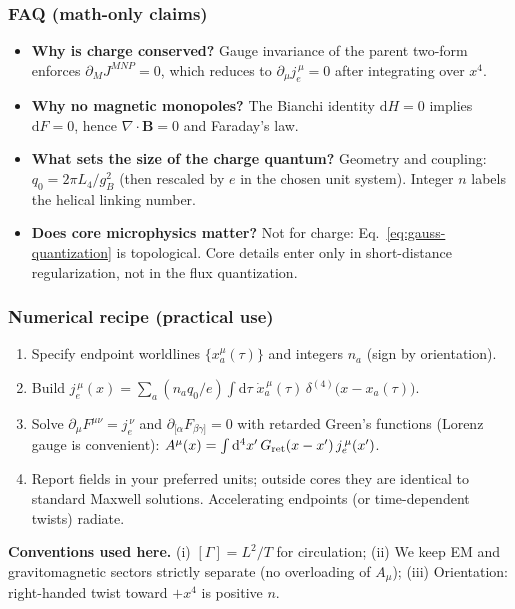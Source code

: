 \subsubsection{FAQ (math-only claims)}
\begin{itemize}
  \item \textbf{Why is charge conserved?} Gauge invariance of the parent two-form enforces $\partial_M J^{MNP}=0$, which reduces to $\partial_\mu j_e^{\,\mu}=0$ after integrating over $x^4$.
  \item \textbf{Why no magnetic monopoles?} The Bianchi identity $\mathrm dH=0$ implies $\mathrm dF=0$, hence $\nabla\!\cdot\!\mathbf B=0$ and Faraday's law.
  \item \textbf{What sets the size of the charge quantum?} Geometry and coupling: $q_0=2\pi L_4/g_B^{2}$ (then rescaled by $e$ in the chosen unit system). Integer $n$ labels the helical linking number.
  \item \textbf{Does core microphysics matter?} Not for charge: Eq.~\eqref{eq:gauss-quantization} is topological. Core details enter only in short-distance regularization, not in the flux quantization.
\end{itemize}

\subsubsection{Numerical recipe (practical use)}
\begin{enumerate}
  \item Specify endpoint worldlines $\{x_a^\mu(\tau)\}$ and integers $n_a$ (sign by orientation).
  \item Build $j_e^{\,\mu}(x)=\sum_a (n_a q_0/e)\int \!\mathrm d\tau\; \dot x_a^{\,\mu}(\tau)\,\delta^{(4)}\big(x-x_a(\tau)\big)$.
  \item Solve $\partial_\mu F^{\mu\nu}= j_e^{\,\nu}$ and $\partial_{[\alpha}F_{\beta\gamma]}=0$ with retarded Green's functions (Lorenz gauge is convenient): $A^\mu(x)=\int \mathrm d^4x'\, G_{\rm ret}(x-x')\, j_e^{\,\mu}(x')$.
  \item Report fields in your preferred units; outside cores they are identical to standard Maxwell solutions. Accelerating endpoints (or time-dependent twists) radiate.
\end{enumerate}

\begin{tcolorbox}
\textbf{Conventions used here.} (i) $[\Gamma]=L^2/T$ for circulation; (ii) We keep EM and gravitomagnetic sectors strictly separate (no overloading of $A_\mu$); (iii) Orientation: right-handed twist toward $+x^4$ is positive $n$.
\end{tcolorbox}


